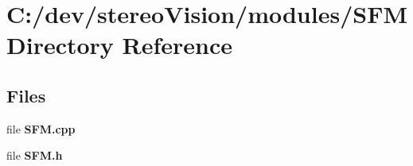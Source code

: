 \section{C\+:/dev/stereo\+Vision/modules/\+S\+F\+M Directory Reference}
\label{dir_dde556652f18110d5b294adf514896ce}
\subsection*{Files}
\begin{DoxyCompactItemize}
\item 
file {\bfseries S\+F\+M.\+cpp}
\item 
file {\bfseries S\+F\+M.\+h}
\end{DoxyCompactItemize}
